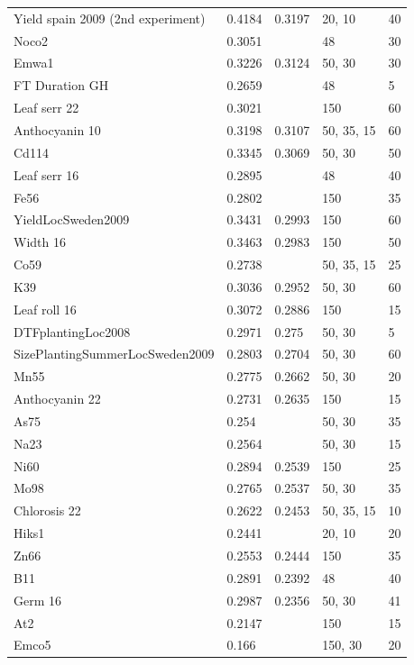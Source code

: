\begin{longtable}{p{} p{} p{} p{} p{}}
  Yield spain 2009 (2nd experiment) & 0.4184 & 0.3197 & 20, 10 & 40 \\
  Noco2 & 0.3051 & \color{red}{0.3174} & 48 & 30 \\
  Emwa1 & 0.3226 & 0.3124 & 50, 30 & 30 \\
  FT Duration GH & 0.2659 & \color{red}{0.3123} & 48 & 5 \\
  Leaf serr 22 & 0.3021 & \color{red}{0.3108} & 150 & 60 \\
  Anthocyanin 10 & 0.3198 & 0.3107 & 50, 35, 15 & 60 \\
  Cd114 & 0.3345 & 0.3069 & 50, 30 & 50 \\
  Leaf serr 16 & 0.2895 & \color{red}{0.3011} & 48 & 40 \\
  Fe56 & 0.2802 & \color{red}{0.3006} & 150 & 35 \\
  YieldLocSweden2009 & 0.3431 & 0.2993 & 150 & 60 \\
  Width 16 & 0.3463 & 0.2983 & 150 & 50 \\
  Co59 & 0.2738 & \color{red}{0.2953} & 50, 35, 15 & 25 \\
  K39 & 0.3036 & 0.2952 & 50, 30 & 60 \\
  Leaf roll 16 & 0.3072 & 0.2886 & 150 & 15 \\
  DTFplantingLoc2008 & 0.2971 & 0.275 & 50, 30 & 5 \\
  SizePlantingSummerLocSweden2009 & 0.2803 & 0.2704 & 50, 30 & 60 \\
  Mn55 & 0.2775 & 0.2662 & 50, 30 & 20 \\
  Anthocyanin 22 & 0.2731 & 0.2635 & 150 & 15 \\
  As75 & 0.254 & \color{red}{0.2619} & 50, 30 & 35 \\
  Na23 & 0.2564 & \color{red}{0.2598} & 50, 30 & 15 \\
  Ni60 & 0.2894 & 0.2539 & 150 & 25 \\
  Mo98 & 0.2765 & 0.2537 & 50, 30 & 35 \\
  Chlorosis 22 & 0.2622 & 0.2453 & 50, 35, 15 & 10 \\
  Hiks1 & 0.2441 & \color{red}{0.2452} & 20, 10 & 20 \\
  Zn66 & 0.2553 & 0.2444 & 150 & 35 \\
  B11 & 0.2891 & 0.2392 & 48 & 40 \\
  Germ 16 & 0.2987 & 0.2356 & 50, 30 & 41 \\
  At2 & 0.2147 & \color{red}{0.216} & 150 & 15 \\
  Emco5 & 0.166 & \color{red}{0.2101} & 150, 30 & 20 \\

\end{longtable}
